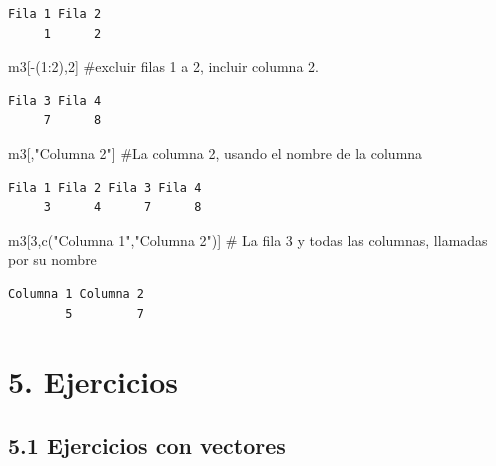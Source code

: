 \documentclass[
  letterpaper,
]{scrbook}
\newenvironment{Shaded}{\begin{snugshade}}{\end{snugshade}}
\newcommand{\CommentTok}[1]{\textcolor[rgb]{0.37,0.37,0.37}{#1}}
\newcommand{\DecValTok}[1]{\textcolor[rgb]{0.68,0.00,0.00}{#1}}
\newcommand{\FunctionTok}[1]{\textcolor[rgb]{0.28,0.35,0.67}{#1}}
\newcommand{\NormalTok}[1]{\textcolor[rgb]{0.00,0.23,0.31}{#1}}
\newcommand{\SpecialCharTok}[1]{\textcolor[rgb]{0.37,0.37,0.37}{#1}}
\newcommand{\StringTok}[1]{\textcolor[rgb]{0.13,0.47,0.30}{#1}}
\begin{document}
\begin{verbatim}
Fila 1 Fila 2 
     1      2 
\end{verbatim}

\begin{Shaded}
\begin{Highlighting}[]
\NormalTok{m3[}\SpecialCharTok{{-}}\NormalTok{(}\DecValTok{1}\SpecialCharTok{:}\DecValTok{2}\NormalTok{),}\DecValTok{2}\NormalTok{] }\CommentTok{\#excluir filas 1 a 2, incluir columna 2.}
\end{Highlighting}
\end{Shaded}

\begin{verbatim}
Fila 3 Fila 4 
     7      8 
\end{verbatim}

\begin{Shaded}
\begin{Highlighting}[]
\NormalTok{m3[,}\StringTok{"Columna 2"}\NormalTok{] }\CommentTok{\#La columna 2, usando el nombre de la columna}
\end{Highlighting}
\end{Shaded}

\begin{verbatim}
Fila 1 Fila 2 Fila 3 Fila 4 
     3      4      7      8 
\end{verbatim}

\begin{Shaded}
\begin{Highlighting}[]
\NormalTok{m3[}\DecValTok{3}\NormalTok{,}\FunctionTok{c}\NormalTok{(}\StringTok{"Columna 1"}\NormalTok{,}\StringTok{"Columna 2"}\NormalTok{)] }\CommentTok{\# La fila 3 y todas las columnas, llamadas por su nombre}
\end{Highlighting}
\end{Shaded}

\begin{verbatim}
Columna 1 Columna 2 
        5         7 
\end{verbatim}

\hypertarget{ejercicios}{%
\section{5. Ejercicios}\label{ejercicios}}

\hypertarget{ejercicios-con-vectores}{%
\subsection{5.1 Ejercicios con vectores}\label{ejercicios-con-vectores}}
\end{document}
